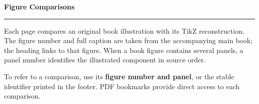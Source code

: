 \documentclass[10pt,openany]{book}
\begin{document}
\pagestyle{empty}
\setlength{\parindent}{0pt}
\begin{titlepage}
  \sffamily\color{BookInk}
  \vspace*{8mm}
  {\large\BookTitle\par}
  \vspace{12mm}
  {\fontsize{34}{40}\selectfont\bfseries Figure Comparisons\par}
  \vspace{5mm}
  {\color{BookAccent}\rule{35mm}{1.2pt}\par}
  \vspace{8mm}
  {\Large\BookAuthor\par}
  \vspace{3mm}
  {\BookAffiliation\par}
  \vspace{4mm}
  {\small\color{BookMuted}\BookEditionDate\par}
  \vfill
  \begin{minipage}{.78\linewidth}
    Each page compares an original book illustration with its TikZ reconstruction.
    The figure number and full caption are taken from the accompanying main book;
    the heading links to that figure. When a book figure contains several panels,
    a panel number identifies the illustrated component in source order.
    \medskip\par
    To refer to a comparison, use its \textbf{figure number and panel}, or the
    stable identifier printed in the footer. PDF bookmarks provide direct access
    to each comparison.
  \end{minipage}
  \vspace{8mm}
\end{titlepage}

\end{document}
